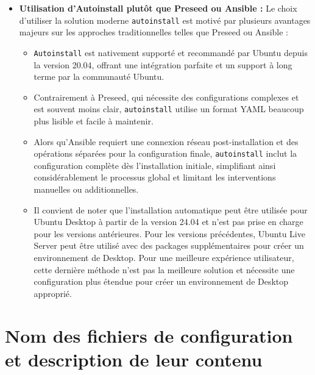 \documentclass[a4paper,12pt]{article}
\begin{document}
\begin{itemize}
\item \textbf{Utilisation d’Autoinstall plutôt que Preseed ou Ansible :} 
Le choix d’utiliser la solution moderne \texttt{autoinstall} est motivé par plusieurs avantages majeurs sur les approches traditionnelles telles que Preseed ou Ansible :
\begin{itemize}
    \item \texttt{Autoinstall} est nativement supporté et recommandé par Ubuntu depuis la version 20.04, offrant une intégration parfaite et un support à long terme par la communauté Ubuntu.
    \item Contrairement à Preseed, qui nécessite des configurations complexes et est souvent moins clair, \texttt{autoinstall} utilise un format YAML beaucoup plus lisible et facile à maintenir.
    \item Alors qu'Ansible requiert une connexion réseau post-installation et des opérations séparées pour la configuration finale, \texttt{autoinstall} inclut la configuration complète dès l’installation initiale, simplifiant ainsi considérablement le processus global et limitant les interventions manuelles ou additionnelles.
    \item Il convient de noter que l'installation automatique peut être utilisée pour Ubuntu Desktop à partir de la version 24.04 et n'est pas prise en charge pour les versions antérieures. Pour les versions précédentes, Ubuntu Live Server peut être utilisé avec des packages supplémentaires pour créer un environnement de Desktop. Pour une meilleure expérience utilisateur, cette dernière méthode n'est pas la meilleure solution et nécessite une configuration plus étendue pour créer un environnement de Desktop approprié.
\end{itemize}

\end{itemize}


\section{Nom des fichiers de configuration et description de leur contenu}
\end{document}
